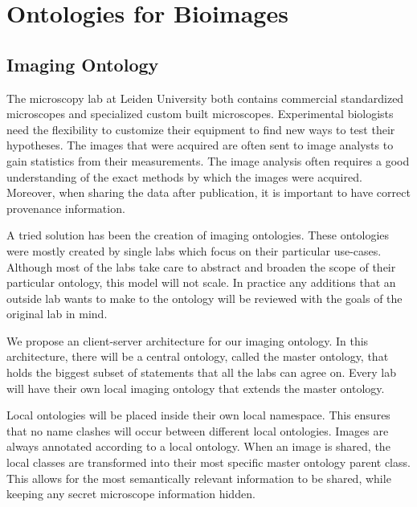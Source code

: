 
\chapter{Ontologies for Bioimages} %

\label{Chapter 3} %



\section{Imaging Ontology}

The microscopy lab at Leiden University both contains commercial
standardized microscopes and specialized custom built
microscopes. Experimental biologists need the flexibility to customize
their equipment to find new ways to test their hypotheses. The images
that were acquired are often sent to image analysts to gain statistics
from their measurements. The image analysis often requires a good
understanding of the exact methods by which the images were
acquired. Moreover, when sharing the data after publication, it is
important to have correct provenance information.

A tried solution has been the creation of imaging ontologies. These
ontologies were mostly created by single labs which focus on their
particular use-cases. Although most of the labs take care to abstract
and broaden the scope of their particular ontology, this model will
not scale. In practice any additions that an outside lab wants to make
to the ontology will be reviewed with the goals of the original lab in
mind.

We propose an client-server architecture for our imaging ontology. In
this architecture, there will be a central ontology, called the master
ontology, that holds the biggest subset of statements that all the
labs can agree on. Every lab will have their own local imaging
ontology that extends the master ontology.

Local ontologies will be placed inside their own local namespace. This
ensures that no name clashes will occur between different local
ontologies. Images are always annotated according to a local
ontology. When an image is shared, the local classes are transformed
into their most specific master ontology parent class. This allows for
the most semantically relevant information to be shared, while keeping
any secret microscope information hidden.

